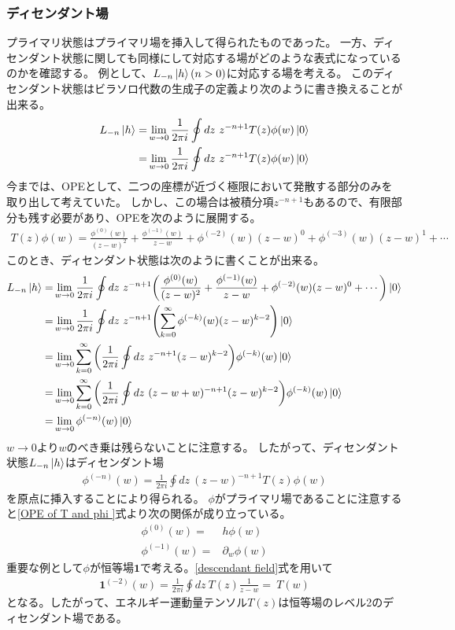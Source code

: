 \documentclass[11pt, dvipdfmx]{article}
\numberwithin{equation}{section}
\newcommand{\blankline}{\par\vspace{\baselineskip}} %
\begin{document}
\subsubsection{ディセンダント場}
プライマリ状態はプライマリ場を挿入して得られたものであった。
一方、ディセンダント状態に関しても同様にして対応する場がどのような表式になっているのかを確認する。
例として、$L_{-n}\ket{h}(n>0)$に対応する場を考える。
このディセンダント状態はビラソロ代数の生成子の定義より次のように書き換えることが出来る。
\begin{align}
    L_{-n}\ket{h}=&\lim_{w \rightarrow 0}\frac{1}{2\pi i}\oint dz \ z^{-n+1} T(z)\phi(w)\ket{0}\\
    =&\lim_{w\rightarrow 0}\frac{1}{2\pi i}\oint dz \ z^{-n+1} T(z)\phi(w)\ket{0}
\end{align}
今までは、OPEとして、二つの座標が近づく極限において発散する部分のみを取り出して考えていた。
しかし、この場合は被積分項$z^{-n+1}$もあるので、有限部分も残す必要があり、OPEを次のように展開する。
\begin{align}
    T(z)\phi(w)=\frac{\phi^{(0)}(w)}{(z-w)^2}+\frac{\phi^{(-1)}(w)}{z-w}+\phi^{(-2)}(w)(z-w)^0+\phi^{(-3)}(w)(z-w)^1+\cdots
\end{align}
このとき、ディセンダント状態は次のように書くことが出来る。
\begin{align}
    L_{-n}\ket{h}=&\lim_{w\rightarrow 0}\frac{1}{2\pi i}\oint dz \ z^{-n+1}\qty(\frac{\phi^{(0)}(w)}{(z-w)^2}+\frac{\phi^{(-1)}(w)}{z-w}+\phi^{(-2)}(w)(z-w)^0+\cdots)\ket{0}\notag\\
    =&\lim_{w\rightarrow 0}\frac{1}{2\pi i}\oint dz \ z^{-n+1}\qty(\sum_{k=0}^{\infty}\phi^{(-k)}(w)(z-w)^{
    k-2})\ket{0}\notag\\
    =&\lim_{w\rightarrow 0}\sum_{k=0}^{\infty}\qty(\frac{1}{2\pi i}\oint dz \ z^{-n+1}(z-w)^{k-2})\phi^{(-k)}(w)\ket{0}\notag\\
    =&\lim_{w\rightarrow 0}\sum_{k=0}^{\infty}\qty(\frac{1}{2\pi i}\oint dz \ (z-w+w)^{-n+1}(z-w)^{k-2})\phi^{(-k)}(w)\ket{0}\notag\\
      =&\lim_{w\rightarrow 0}\phi^{(-n )}(w)\ket{0}
\end{align}
$w\rightarrow 0$より$w$のべき乗は残らないことに注意する。
したがって、ディセンダント状態$L_{-n}\ket{h}$はディセンダント場
\begin{align}
    \phi^{(-n)}(w)=\frac{1}{2\pi i}\oint dz \ (z-w)^{-n+1}T(z)\phi(w)\label{descendant field}
\end{align}
を原点に挿入することにより得られる。
$\phi$がプライマリ場であることに注意すると\eqref{OPE of T and phi }式より次の関係が成り立っている。
\begin{align}
    \phi^{(0)}(w)=&h\phi(w)\\
    \phi^{(-1)}(w)=&\partial_w \phi(w)
\end{align}
重要な例として$\phi$が恒等場$\bm{1}$で考える。\eqref{descendant field}式を用いて
\begin{align}
    \bm{1}^{(-2)}(w)=\frac{1}{2\pi i}\oint dz \ T(z)\frac{1}{z-w}=\ T(w)
\end{align}
となる。したがって、エネルギー運動量テンソル$T(z)$は恒等場のレベル2のディセンダント場である。
\blankline
\end{document}
